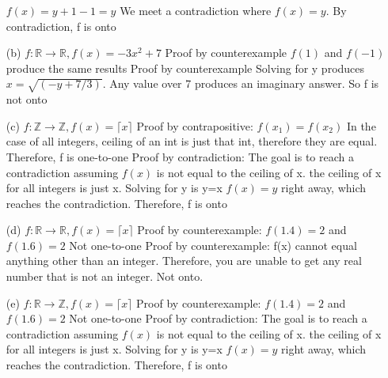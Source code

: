 \documentclass[10pt]{exam}
\begin{document}
\begin{questions}
\begin{enumerate}
 \newline $f(x) = y+1-1 = y$
 \newline We meet a contradiction where $f(x) = y$. By contradiction, f is onto
 \item[(b)] $f: \mathbb{R} \rightarrow \mathbb{R}, f(x) = -3x^2 + 7$
 \newline Proof by counterexample
 \newline $f(1)$ and $f(-1)$ produce the same results
 \newline Proof by counterexample
 \newline Solving for y produces $ x =\sqrt{(-y+7/3)}$. Any value over 7 produces an imaginary answer. 
 \newline So f is not onto
 \item[(c)] $f: \mathbb{Z} \rightarrow \mathbb{Z}, f(x) = \lceil x \rceil$
 \newline Proof by contrapositive:
 \newline $f(x_1) = f(x_2)$
 \newline In the case of all integers, ceiling of an int is just that int, therefore they are equal. Therefore, f is one-to-one
 \newline Proof by contradiction:
 \newline The goal is to reach a contradiction assuming $f(x)$ is not equal to the ceiling of x.
 \newline the ceiling of x for all integers is just x. Solving for y is y=x
 \newline $f(x) = y$ right away, which reaches the contradiction. Therefore, f is onto
 \item[(d)] $f: \mathbb{R} \rightarrow \mathbb{R}, f(x) = \lceil x \rceil$
 \newline Proof by counterexample:
 \newline $f(1.4) = 2$ and $f(1.6) = 2$
 \newline Not one-to-one
 \newline Proof by counterexample:
 \newline f(x) cannot equal anything other than an integer. Therefore, you are unable to get any real number that is not an integer. Not onto.
 \item[(e)] $f: \mathbb{R} \rightarrow \mathbb{Z}, f(x) = \lceil x \rceil$
 \newline Proof by counterexample:
 \newline $f(1.4) = 2$ and $f(1.6) = 2$
 \newline Not one-to-one
 \newline Proof by contradiction:
 \newline The goal is to reach a contradiction assuming $f(x)$ is not equal to the ceiling of x.
 \newline the ceiling of x for all integers is just x. Solving for y is y=x
 \newline $f(x) = y$ right away, which reaches the contradiction. Therefore, f is onto
 

\end{enumerate}
\end{questions}
\end{document}
